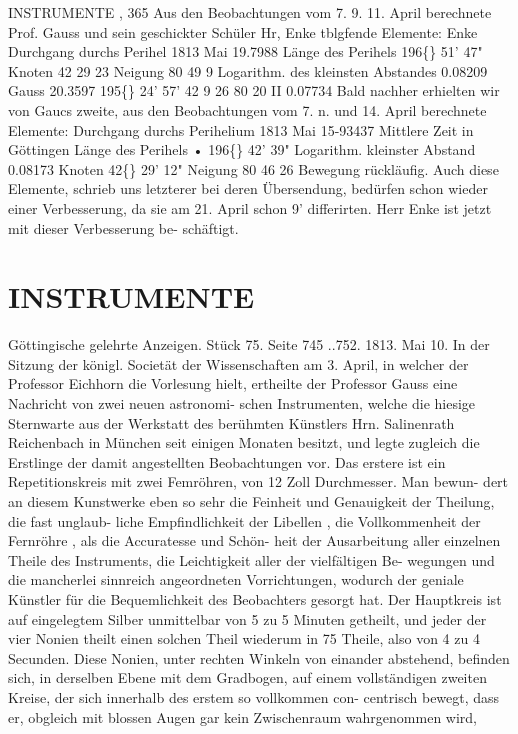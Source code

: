 \documentclass[12pt,a4paper]{article}
\newcommand{\degree}{\textdegree}
\begin{document}
\newpage
INSTRUMENTE ,  365 
Aus  den  Beobachtungen  vom  7.  9.  11.  April  berechnete  Prof.  Gauss  und  sein  geschickter  Schüler 
Hr,  Enke  tblgfende  Elemente: 
Enke 
Durchgang  durchs  Perihel  1813      Mai  19.7988 
Länge  des  Perihels   
196\degree\{\}  51'    47" 
Knoten   
42     29     23 
Neigung   
80     49      9 
Logarithm.  des  kleinsten  Abstandes       0.08209 
Gauss 
20.3597 
195\degree\{\}  24'  57' 
42  9  26 
80     20     II 
0.07734 
Bald  nachher  erhielten  wir  von  Gaucs  zweite,  aus  den  Beobachtungen  vom  7.  n.  und  14.  April 
berechnete  Elemente: 
Durchgang  durchs  Perihelium  1813  Mai  15-93437  Mittlere  Zeit  in  Göttingen 
Länge  des  Perihels   •   
196\degree\{\}  42'    39" 
Logarithm.  kleinster  Abstand   
0.08173 
Knoten   
42\degree\{\}  29'    12" 
Neigung   
80    46     26 
Bewegung  rückläufig. 
Auch  diese  Elemente,  schrieb  uns  letzterer  bei  deren  Übersendung,  bedürfen  schon  wieder  einer 
Verbesserung,  da  sie  am  21.  April  schon  9'  differirten.  Herr  Enke  ist  jetzt  mit  dieser  Verbesserung  be- 
schäftigt. 

\section*{INSTRUMENTE}
Göttingische  gelehrte  Anzeigen.     Stück  75.  Seite  745  ..752.     1813.   Mai  10. 
In  der  Sitzung  der  königl.  Societät  der  Wissenschaften  am  3.  April,  in  welcher  der  Professor 
Eichhorn  die  Vorlesung  hielt,  ertheilte  der  Professor  Gauss  eine  Nachricht  von  zwei  neuen  astronomi- 
schen Instrumenten,  welche  die  hiesige  Sternwarte  aus  der  Werkstatt  des  berühmten  Künstlers  Hrn. 
Salinenrath  Reichenbach  in  München  seit  einigen  Monaten  besitzt,  und  legte  zugleich  die  Erstlinge  der 
damit  angestellten  Beobachtungen  vor. 
Das  erstere  ist  ein  Repetitionskreis  mit  zwei  Femröhren,  von  12  Zoll  Durchmesser.  Man  bewun- 
dert an  diesem  Kunstwerke  eben  so  sehr  die  Feinheit  und  Genauigkeit  der  Theilung,  die  fast  unglaub- 
liche Empfindlichkeit  der  Libellen ,  die  Vollkommenheit  der  Fernröhre ,  als  die  Accuratesse  und  Schön- 
heit der  Ausarbeitung  aller  einzelnen  Theile  des  Instruments,  die  Leichtigkeit  aller  der  vielfältigen  Be- 
wegungen und  die  mancherlei  sinnreich  angeordneten  Vorrichtungen,  wodurch  der  geniale  Künstler  für 
die  Bequemlichkeit  des  Beobachters  gesorgt  hat. 
Der  Hauptkreis  ist  auf  eingelegtem  Silber  unmittelbar  von  5  zu  5  Minuten  getheilt,  und  jeder 
der  vier  Nonien  theilt  einen  solchen  Theil  wiederum  in  75  Theile,  also  von  4  zu  4  Secunden.  Diese 
Nonien,  unter  rechten  Winkeln  von  einander  abstehend,  befinden  sich,  in  derselben  Ebene  mit  dem 
Gradbogen,  auf  einem  vollständigen  zweiten  Kreise,  der  sich  innerhalb  des  erstem  so  vollkommen  con- 
centrisch  bewegt,    dass  er,    obgleich  mit  blossen  Augen   gar    kein  Zwischenraum  wahrgenommen  wird, 
\end{document}
